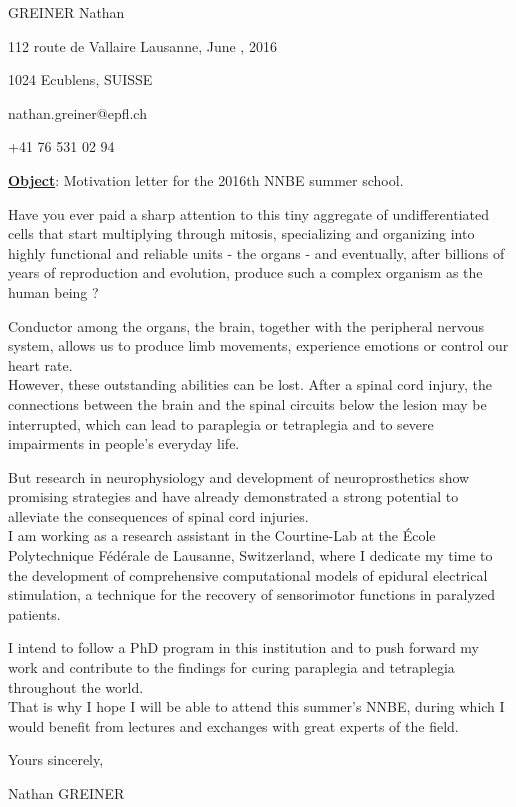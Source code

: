 \documentclass[a4paper,oneside,12pt]{article}
\begin{document}
\thispagestyle{empty}




\begin{flushleft}
GREINER Nathan

112 route de Vallaire \hspace{6.5cm} Lausanne, June , 2016

1024 Ecublens, SUISSE

nathan.greiner@epfl.ch

+41 76 531 02 94
\end{flushleft}

\vspace{2cm}

\begin{flushright}
\textbf{\uline{Object}}: Motivation letter for the 2016th NNBE summer school.
\end{flushright}

\vspace{1cm}

Have you ever paid a sharp attention to this tiny aggregate of undifferentiated cells that start multiplying through mitosis, specializing and organizing into highly functional and reliable units - the organs - and eventually, after billions of years of reproduction and evolution, produce such a complex organism as the human being ?

Conductor among the organs, the brain, together with the peripheral nervous system, allows us to produce limb movements, experience emotions or control our heart rate. \\

However, these outstanding abilities can be lost. After a spinal cord injury, the connections between the brain and the spinal circuits below the lesion may be interrupted, which can lead to paraplegia or tetraplegia and to severe impairments in people's everyday life.

But research in neurophysiology and development of neuroprosthetics show promising strategies and have already demonstrated a strong potential to alleviate the consequences of spinal cord injuries. \\

I am working as a research assistant in the Courtine-Lab at the École Polytechnique Fédérale de Lausanne, Switzerland, where I dedicate my time to the development of comprehensive computational models of epidural electrical stimulation, a technique for the recovery of sensorimotor functions in paralyzed patients.

I intend to follow a PhD program in this institution and to push forward my work and contribute to the findings for curing paraplegia and tetraplegia throughout the world. \\

That is why I hope I will be able to attend this summer’s NNBE, during which I would benefit from lectures and exchanges with great experts of the field. \\

\vspace{2mm}

Yours sincerely, 

\begin{flushright}
Nathan GREINER
\end{flushright}
\end{document}
